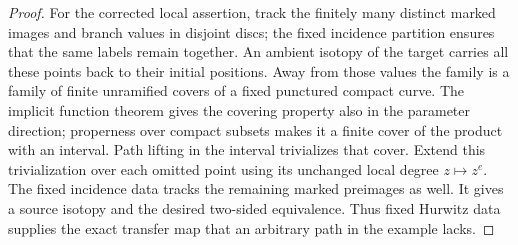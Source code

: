 \begin{proof}
For the corrected local assertion, track the finitely many distinct
marked images and branch values in disjoint discs; the fixed incidence
partition ensures that the same labels remain together. An ambient
isotopy of the target carries all these points back to their initial
positions. Away from those values the family is a family of finite
unramified covers of a fixed punctured compact curve. The implicit
function theorem gives the covering property also in the parameter
direction; properness over compact subsets makes it a finite cover
of the product with an interval. Path lifting in the interval
trivializes that cover. Extend this trivialization over each omitted
point using its unchanged local degree $z\mapsto z^e$. The fixed
incidence data tracks the remaining marked preimages as well. It
gives a source isotopy and the desired two-sided equivalence.
Thus fixed Hurwitz data supplies the exact transfer map that an
arbitrary path in the example lacks.
\end{proof}

